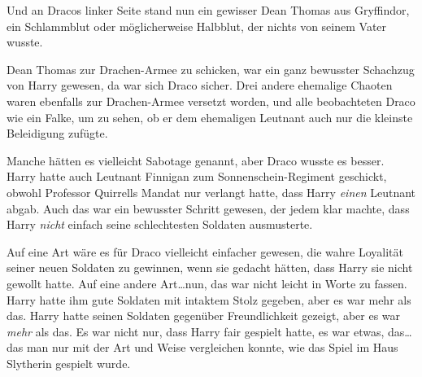 Und an Dracos linker Seite stand nun ein gewisser Dean Thomas aus Gryffindor, ein Schlammblut oder möglicherweise Halbblut, der nichts von seinem Vater wusste.

Dean Thomas zur Drachen-Armee zu schicken, war ein ganz bewusster Schachzug von Harry gewesen, da war sich Draco sicher. Drei andere ehemalige Chaoten waren ebenfalls zur Drachen-Armee versetzt worden, und alle beobachteten Draco wie ein Falke, um zu sehen, ob er dem ehemaligen Leutnant auch nur die kleinste Beleidigung zufügte.

Manche hätten es vielleicht Sabotage genannt, aber Draco wusste es besser. Harry hatte auch Leutnant Finnigan zum Sonnenschein-Regiment geschickt, obwohl Professor Quirrells Mandat nur verlangt hatte, dass Harry \emph{einen} Leutnant abgab. Auch das war ein bewusster Schritt gewesen, der jedem klar machte, dass Harry \emph{nicht} einfach seine schlechtesten Soldaten ausmusterte.

Auf eine Art wäre es für Draco vielleicht einfacher gewesen, die wahre Loyalität seiner neuen Soldaten zu gewinnen, wenn sie gedacht hätten, dass Harry sie nicht gewollt hatte. Auf eine andere Art…nun, das war nicht leicht in Worte zu fassen. Harry hatte ihm gute Soldaten mit intaktem Stolz gegeben, aber es war mehr als das. Harry hatte seinen Soldaten gegenüber Freundlichkeit gezeigt, aber es war \emph{mehr} als das. Es war nicht nur, dass Harry fair gespielt hatte, es war etwas, das…das man nur mit der Art und Weise vergleichen konnte, wie das Spiel im Haus Slytherin gespielt wurde.

